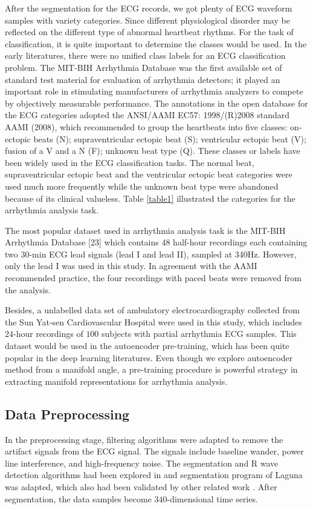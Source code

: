 \documentclass[journal]{IEEEtran}
\begin{document}
After the segmentation for the ECG records, we got plenty of ECG waveform samples with variety categories. 
Since different physiological disorder may be reflected on the different type of abnormal heartbeat rhythms. 
For the task of classification, it is quite important to determine the classes would be used. 
In the early literatures, there were no unified class labels for an ECG classification problem. 
The MIT-BIH Arrhythmia Database was the first available set of standard test material for evaluation of arrhythmia detectors; it played an important role in stimulating manufacturers of arrhythmia analyzers to compete by objectively measurable performance. 
The annotations in the open database for the ECG categories adopted the ANSI/AAMI EC57: 1998/(R)2008 standard AAMI (2008), which recommended to group the heartbeats into five classes: on-ectopic beats (N); supraventricular ectopic beat (S); ventricular ectopic beat (V); fusion of a V and a N (F); unknown beat type (Q). These classes or labels have been widely used in the ECG classification tasks. 
The normal beat, supraventricular ectopic beat and the ventricular ectopic beat categories were used much more frequently while the unknown beat type were abandoned because of its clinical valueless.
Table \ref{table1} illustrated the categories for the arrhythmia analysis task.

The most popular dataset used in arrhythmia analysis task is the MIT-BIH Arrhythmia Database [23] which contains 48 half-hour recordings each containing two 30-min ECG lead signals (lead I and lead II), sampled at 340Hz. 
However, only the lead I was used in this study. 
In agreement with the AAMI recommended practice, the four recordings with paced beats were removed from the analysis. 

Besides, a unlabelled data set of ambulatory electrocardiography collected from the Sun Yat-sen Cardiovascular Hospital were used in this study, which includes $24$-hour recordings of $100$ subjects with partial arrhythmia ECG samples. 
This dataset would be used in the autoencoder pre-training, which has been quite popular in the deep learning literatures.
Even though we explore autoencoder method from a manifold angle, a pre-training procedure is powerful strategy in extracting manifold representations for arrhythmia analysis.




%
%
\subsection{Data Preprocessing}
In the preprocessing stage, filtering algorithms were adapted to remove the artifact signals from the ECG signal. 
The signals include baseline wander, power line interference, and high-frequency noise. 
The segmentation and R wave detection algorithms had been explored in \cite{afonso} and segmentation program of Laguna \cite{sornmo2006electrocardiogram} was adapted, which also had been validated by other related work \cite{chaza}. 
After segmentation, the data samples become $340$-dimensional time series.
\end{document}
